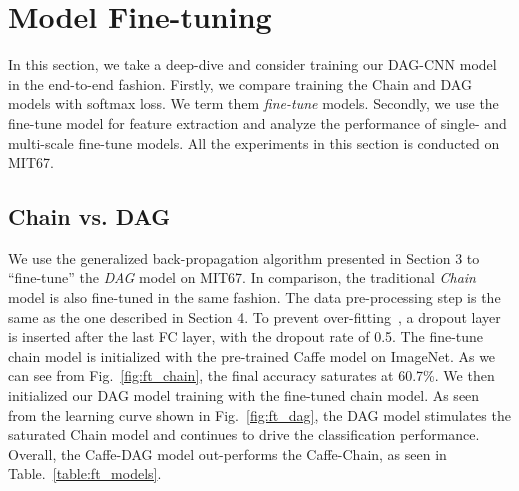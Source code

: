 \documentclass[10pt,twocolumn,letterpaper]{article}
\begin{document}
\section{Model Fine-tuning}

In this section, we take a deep-dive and consider training our DAG-CNN model in the end-to-end fashion. Firstly, we compare training the Chain and DAG models with softmax loss. We term them \textit{fine-tune} models. Secondly, we use the fine-tune model for feature extraction and analyze the performance of single- and multi-scale fine-tune models. All the experiments in this section is conducted on MIT67. 


\subsection{Chain vs. DAG} 

We use the generalized back-propagation algorithm presented in Section 3 to ``fine-tune'' the \textit{DAG} model on MIT67. In comparison, the traditional \textit{Chain} model is also fine-tuned in the same fashion. The data pre-processing step is the same as the one described in Section 4. To prevent over-fitting~\cite{AlexNet}, a dropout layer is inserted after the last FC layer, with the dropout rate of 0.5. The fine-tune chain model is initialized with the pre-trained Caffe model on ImageNet. As we can see from Fig.~\ref{fig:ft_chain}, the final accuracy saturates at 60.7\%. We then initialized our DAG model training with the fine-tuned chain model. As seen from the learning curve shown in Fig.~\ref{fig:ft_dag}, the DAG model stimulates the saturated Chain model and continues to drive the classification performance. Overall, the Caffe-DAG model out-performs the Caffe-Chain, as seen in Table.~\ref{table:ft_models}.
\end{document}
